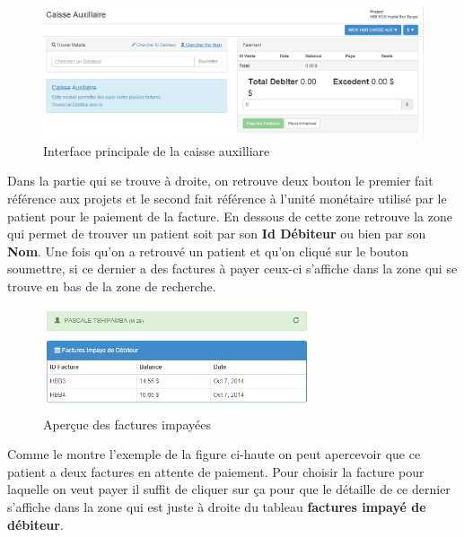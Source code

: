 \documentclass[12pt,a4paper]{report}
\begin{document}
\begin{figure}[h]
\begin{center}
\includegraphics[width=14cm]{pic/CaisseAuxillaire.png}
\end{center}
\caption{Interface principale de la caisse auxilliare}
\label{Interface principale de la caisse auxilliare}
\end{figure}

Dans la partie qui se trouve à droite, on retrouve deux bouton le premier fait référence aux projets et le second fait référence à l'unité monétaire utilisé par le patient pour le paiement de la facture. En dessous de cette zone retrouve la zone qui permet de trouver un patient soit par son \textbf{Id Débiteur} ou bien par son \textbf{Nom}. 
Une fois qu'on a retrouvé un patient et qu'on cliqué sur le bouton soumettre, si ce dernier a des factures à payer ceux-ci s'affiche dans la zone qui se trouve en bas de la zone de recherche. 

\begin{figure}[h]
\begin{center}
\includegraphics[width=8cm]{pic/ViewInvoice.png}
\end{center}
\caption{Aperçue des factures impayées}
\label{Aperçue des factures impayées}
\end{figure}

Comme le montre l'exemple de la figure ci-haute on peut apercevoir que ce patient a deux factures en attente de paiement. Pour choisir la facture pour laquelle on veut payer il suffit de cliquer sur ça pour que le détaille de ce dernier s'affiche dans la zone qui est juste à droite du tableau \textbf{factures impayé de débiteur}.
\end{document}
